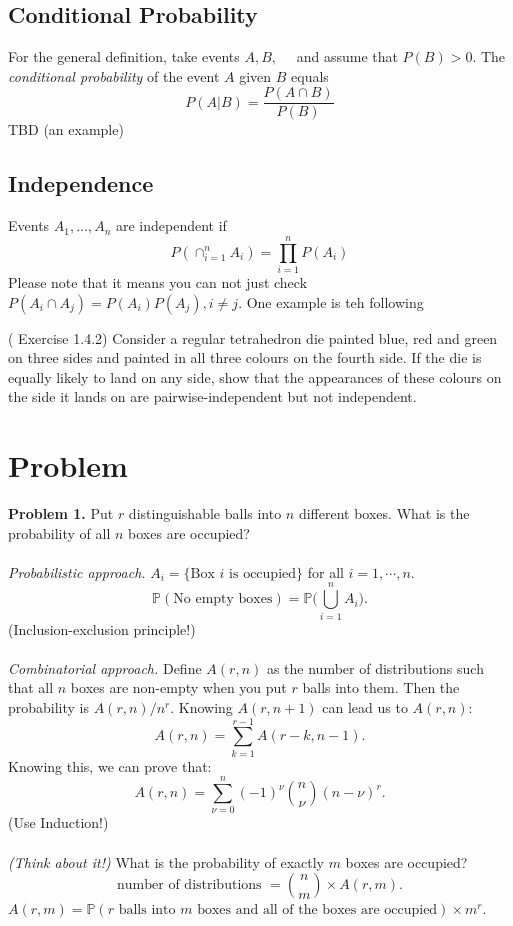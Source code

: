 \subsection{Conditional Probability}
For the general definition, take events \(A, B,\quad\) and assume that \(P(B) > 0\). The \textit{conditional probability} of the event \(A\) given \(B\) equals 
\[
    P(A|B) = \frac{P(A\cap B)}{P(B)}
\]
TBD (an example)
\subsection{Independence}
Events \(A_1,\dots,A_n\) are independent if 
\[
    P(\cap_{i = 1}^n A_i) = \prod_{i=1}^nP(A_i)
\]
Please note that it means you can not just check \(P(A_i\cap A_j) = P(A_i)P(A_j), i \neq j\). One example is teh following 
\begin{eg}
(\cite{IntroPanchenko} Exercise 1.4.2) Consider a regular tetrahedron die painted
blue, red and green on three sides and painted in all three
colours on the fourth side. If the die is equally likely to land
on any side, show that the appearances of these colours on
the side it lands on are pairwise-independent but not independent.
\end{eg}
\section{Problem}
\textbf{Problem 1.} Put $r$ distinguishable balls into $n$ different boxes. What is the probability of all $n$ boxes are occupied?\\ \\
\textit{Probabilistic approach.} $A_i=\{\text{Box $i$ is occupied}\}$ for all $i=1,\cdots, n$.
\begin{equation}
\mathbb{P}(\text{No empty boxes}) = \mathbb{P}\Big(\bigcup_{i=1}^n A_i\Big).
\end{equation}
(Inclusion-exclusion principle!)\\ \\
\textit{Combinatorial approach.} Define $A(r,n)$ as the number of distributions such that all $n$ boxes are non-empty when you put $r$ balls into them. Then the probability is $A(r,n)/n^r$. Knowing $A(r,n+1)$ can lead us to $A(r,n)$:
\begin{equation}
A(r,n) = \sum_{k=1}^{r-1}A(r-k,n-1).
\end{equation}
Knowing this, we can prove that:
\begin{equation}
A(r,n) = \sum_{\nu = 0}^n(-1)^\nu\binom{n}{\nu}(n-\nu)^r.
\end{equation}
(Use Induction!)\\ \\
\textit{(Think about it!)} What is the probability of exactly $m$ boxes are occupied?
\begin{equation}
\text{number of distributions }= \binom{n}{m}\times A(r,m).
\end{equation}
$A(r,m) = \mathbb{P}(\text{$r$ balls into $m$ boxes and all of the boxes are occupied})\times m^r$.

